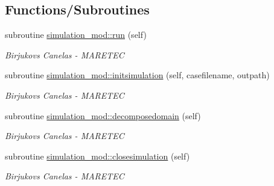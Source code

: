 \subsection*{Functions/\+Subroutines}
\begin{DoxyCompactItemize}
\item 
subroutine \hyperlink{namespacesimulation__mod_a73bd78c4ac76c51f1e10f5847c25c4df}{simulation\+\_\+mod\+::run} (self)
\begin{DoxyCompactList}\small\item\em Birjukovs Canelas -\/ M\+A\+R\+E\+T\+EC \end{DoxyCompactList}\item 
subroutine \hyperlink{namespacesimulation__mod_aedbba2bb458cbcd7eb93938a5f7b5940}{simulation\+\_\+mod\+::initsimulation} (self, casefilename, outpath)
\begin{DoxyCompactList}\small\item\em Birjukovs Canelas -\/ M\+A\+R\+E\+T\+EC \end{DoxyCompactList}\item 
subroutine \hyperlink{namespacesimulation__mod_a2b8198a9fb3f7671c6b45192a0b9740c}{simulation\+\_\+mod\+::decomposedomain} (self)
\begin{DoxyCompactList}\small\item\em Birjukovs Canelas -\/ M\+A\+R\+E\+T\+EC \end{DoxyCompactList}\item 
subroutine \hyperlink{namespacesimulation__mod_a4285722eaa589fa671233554b54c74f8}{simulation\+\_\+mod\+::closesimulation} (self)
\begin{DoxyCompactList}\small\item\em Birjukovs Canelas -\/ M\+A\+R\+E\+T\+EC \end{DoxyCompactList}\end{DoxyCompactItemize}
